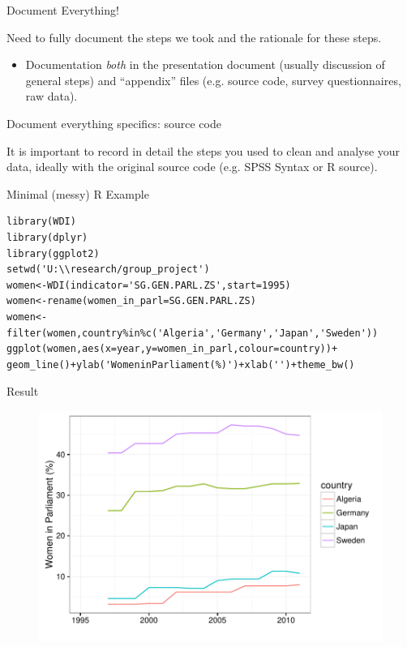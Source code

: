 \documentclass[10pt]{beamer}
\begin{document}
\begin{frame}{Document Everything!}

    Need to \alert{fully document} the steps we took and the rationale for these steps.

    \begin{itemize}
        \item Documentation \emph{both} in the presentation document (usually discussion of general steps) and ``appendix'' files (e.g. source code, survey questionnaires, raw data).
    \end{itemize}

\end{frame}

\begin{frame}{Document everything specifics: source code}

    It is important to record in detail the steps you used to clean and analyse your data, ideally with the original source code (e.g. SPSS Syntax or R source).

\end{frame}

\begin{frame}[fragile]{Minimal (messy) R Example}

\begin{lstlisting}
library(WDI)
library(dplyr)
library(ggplot2)
setwd('U:\\research/group_project')
women<-WDI(indicator='SG.GEN.PARL.ZS',start=1995)
women<-rename(women_in_parl=SG.GEN.PARL.ZS)
women<-filter(women,country%in%c('Algeria','Germany','Japan','Sweden'))
ggplot(women,aes(x=year,y=women_in_parl,colour=country))+
geom_line()+ylab('WomeninParliament(%)')+xlab('')+theme_bw()
\end{lstlisting}

\end{frame}

\begin{frame}{Result}

    \begin{figure}
        \includegraphics[scale=0.5]{img/women_compare.pdf}
    \end{figure}

\end{frame}
\end{document}
